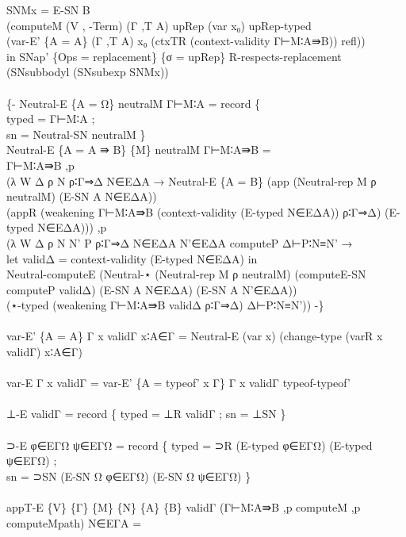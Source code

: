 {\begin{code}
{\>      SNMx = E-SN B \<\\
\>             (computeM (V , -Term) (Γ ,T A) upRep (var x₀) upRep-typed \<\\
\>             (var-E' \{A = A\} (Γ ,T A) x₀ (ctxTR (context-validity Γ⊢M∶A⇛B)) refl)) \<\\
\>  in SNap' \{Ops = replacement\} \{σ = upRep\} R-respects-replacement (SNsubbodyl (SNsubexp SNMx)) \<\\
\>\<\\
\>\{- Neutral-E \{A = Ω\} neutralM Γ⊢M∶A = record \{ \<\\
\>  typed = Γ⊢M∶A ; \<\\
\>  sn = Neutral-SN neutralM \}\<\\
\>Neutral-E \{A = A ⇛ B\} \{M\} neutralM Γ⊢M∶A⇛B = \<\\
\>  Γ⊢M∶A⇛B ,p \<\\
\>  (λ W Δ ρ N ρ∶Γ⇒Δ N∈EΔA → Neutral-E \{A = B\} (app (Neutral-rep M ρ neutralM) (E-SN A N∈EΔA)) \<\\
\>    (appR (weakening Γ⊢M∶A⇛B (context-validity (E-typed N∈EΔA)) ρ∶Γ⇒Δ) (E-typed N∈EΔA))) ,p \<\\
\>  (λ W Δ ρ N N' P ρ∶Γ⇒Δ N∈EΔA N'∈EΔA computeP Δ⊢P∶N≡N' → \<\\
\>    let validΔ = context-validity (E-typed N∈EΔA) in\<\\
\>    Neutral-computeE (Neutral-⋆ (Neutral-rep M ρ neutralM) (computeE-SN computeP validΔ) (E-SN A N∈EΔA) (E-SN A N'∈EΔA)) \<\\
\>    (⋆-typed (weakening Γ⊢M∶A⇛B validΔ ρ∶Γ⇒Δ) Δ⊢P∶N≡N')) -\}\<\\
\>\<\\
\>var-E' \{A = A\} Γ x validΓ x∶A∈Γ = Neutral-E (var x) (change-type (varR x validΓ) x∶A∈Γ)\<\\
\>\<\\
\>var-E Γ x validΓ = var-E' \{A = typeof' x Γ\} Γ x validΓ typeof-typeof'\<\\
\>\<\\
\>⊥-E validΓ = record \{ typed = ⊥R validΓ ; sn = ⊥SN \}\<\\
\>\<\\
\>⊃-E φ∈EΓΩ ψ∈EΓΩ = record \{ typed = ⊃R (E-typed φ∈EΓΩ) (E-typed ψ∈EΓΩ) ; \<\\
\>  sn = ⊃SN (E-SN Ω φ∈EΓΩ) (E-SN Ω ψ∈EΓΩ) \}\<\\
\>\<\\
\>appT-E \{V\} \{Γ\} \{M\} \{N\} \{A\} \{B\} validΓ (Γ⊢M∶A⇛B ,p computeM ,p computeMpath) N∈EΓA = \<\\
}
\end{code}}
